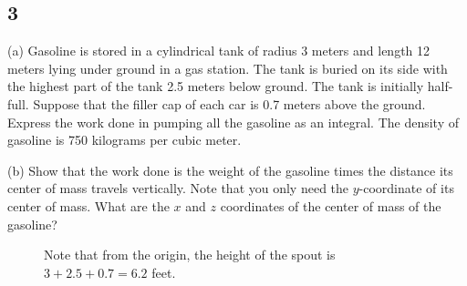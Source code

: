 \documentclass[../hw7]{subfiles}
\begin{document}
\subsection*{3}
(a) Gasoline is stored in a cylindrical tank of radius 3 meters and length 12 meters lying under ground in a gas station. The tank is buried on its side with the highest part of the tank 2.5 meters below ground. The tank is initially half-full. Suppose that the filler cap of each car is 0.7 meters above the ground. Express the work done in pumping all the gasoline as an integral. The density of gasoline is 750 kilograms per cubic meter.

(b) Show that the work done is the weight of the gasoline times the distance its center of mass travels vertically. Note that you only need the $y$-coordinate of its center of mass. What are the $x$ and $z$ coordinates of the center of mass of the gasoline?


\begin{figure*}[ht]
\centering
\begin{minipage}{0.4\textwidth}
    \centering
\end{minipage}
\begin{minipage}{0.4\textwidth}
    \centering
\end{minipage}
\caption{Note that from the origin, the height of the spout is $3+2.5+0.7=6.2$ feet.}
\end{figure*}
\end{document}
